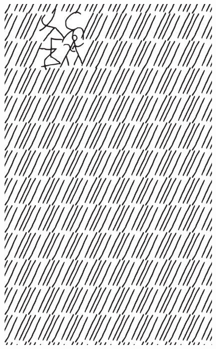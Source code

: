 \makeatletter\@openrightfalse
\movetooddpage
\begin{absolutelynopagebreak}
\begin{vplace}
\begin{figure}[H]
\begin{adjustwidth}{-0.99cm}{}
  \centering
  \vspace*{-1.77cm}
  \includegraphics[width=110mm]{./imgs/img2.pdf}  
  \hfill
\end{adjustwidth}

\thispagestyle{empty}

\end{figure}
\end{vplace}

\end{absolutelynopagebreak}

